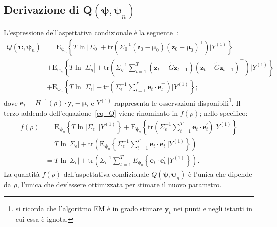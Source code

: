 \subsection[Derivazione di Q$(\boldsymbol{\psi}, \boldsymbol{\psi}_n)$]{Derivazione di Q$(\boldsymbol{\psi}, \boldsymbol{\psi}_n)$}
L'espressione dell'aspettativa condizionale è la seguente~\cite{paper_GRASPA}:
\begin{equation}
	\begin{split}
		Q(\boldsymbol{\psi},\boldsymbol{\psi}_n) & = \text{E}_{\boldsymbol{\psi}_n}\left\{T\ln|\Sigma_0| + \text{tr}\left(\Sigma_0^{-1}\left(\mathbf{z}_0 - \boldsymbol{\mu}_0\right)\left(\mathbf{z}_0 - \boldsymbol{\mu}_0\right)^\top\right)\bigg| Y^{(1)}\right\} \\
		& + \text{E}_{\boldsymbol{\psi}_n}\left\{T\ln|\Sigma_\eta| + \text{tr}\left(\Sigma_\eta^{-1}\sum_{t=1}^{T}\left(\mathbf{z}_t - \tilde{G}\mathbf{z}_{t-1}\right)\left(\mathbf{z}_t - \tilde{G}\mathbf{z}_{t-1}\right)^\top\right)\bigg| Y^{(1)}\right\} \\
		& + \text{E}_{\boldsymbol{\psi}_n}\left\{T\ln|\Sigma_\epsilon| + \text{tr}\left(\Sigma_\epsilon^{-1}\sum_{t=1}^{T}\mathbf{e}_t\cdot\mathbf{e}_t^\top\right)\bigg| Y^{(1)}\right\};
	\end{split}
	\label{eq_Q}
\end{equation}
dove $\mathbf{e}_t = H^{-1}(\rho)\cdot\mathbf{y}_t - \boldsymbol{\mu}_t$ e $Y^{(1)}$ rappresenta le osservazioni disponibili\footnote{si ricorda che l'algoritmo EM è in grado stimare $\mathbf{y}_t$ nei punti e negli istanti in cui essa è ignota.}. Il terzo addendo dell'equazione~\ref{eq_Q} viene rinominato in $f(\rho)$; nello specifico:
\begin{equation}
	\begin{split}
		f(\rho) & = \text{E}_{\boldsymbol{\psi}_n}\left\{T\ln|\Sigma_\epsilon| \ \bigg|Y^{(1)}\right\} + \text{E}_{\boldsymbol{\psi}_n}\left\{\text{tr}\left(\Sigma_\epsilon^{-1}\sum_{t=1}^{T}\mathbf{e}_t\cdot\mathbf{e}_t^\prime\right)\bigg|Y^{(1)}\right\} \\
		& = T\ln|\Sigma_\epsilon| + \text{tr}\left(\text{E}_{\boldsymbol{\psi}_n}\left\{\Sigma_\epsilon^{-1}\sum_{t=1}^{T}\mathbf{e}_t\cdot\mathbf{e}_t^\prime \ \bigg|Y^{(1)}\right\}\right) \\
		& = T\ln|\Sigma_\epsilon| + \text{tr}\left(\Sigma_\epsilon^{-1}\sum_{t=1}^{T}E_{\boldsymbol{\psi}_n}\left\{\mathbf{e}_t\cdot\mathbf{e}_t^\prime \ \bigg| Y^{(1)}\right\}\right).
	\end{split}
\end{equation}
La quantità $f(\rho)$ dell'aspettativa condizionale $Q(\boldsymbol{\psi}, \boldsymbol{\psi}_n)$ è l'unica che dipende da $\rho$, l'unica che dev'essere ottimizzata per stimare il nuovo parametro.

